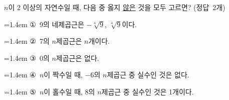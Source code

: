 $n$이 2 이상의 자연수일 때, 다음 중 옳지 \underline{않은} 것을 모두 고르면? \mbox{(정답 2개)}
\par\medskip\par\noindent\hangindent=1.4em {\small ①}\ 9의 네제곱근은 $-\sqrt[4]{9}$, $\sqrt[4]{9}$이다.\par\noindent\hangindent=1.4em {\small ②}\ 7의 $n$제곱근은 $n$개이다.\par\noindent\hangindent=1.4em {\small ③}\ 0의 $n$제곱근은 없다.\par\noindent\hangindent=1.4em {\small ④}\ $n$이 짝수일 때, $-6$의 $n$제곱근 중 실수인 것은 없다.\par\noindent\hangindent=1.4em {\small ⑤}\ $n$이 홀수일 때, 8의 $n$제곱근 중 실수인 것은 1개이다.\par\medskip
